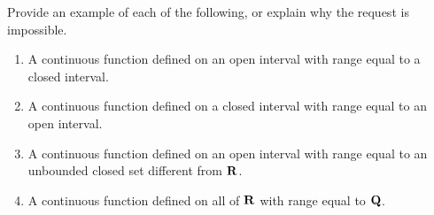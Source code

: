 \documentclass{lew98_solutions}
\begin{document}
\begin{exercise}
\label{ex:4.5.2}
    Provide an example of each of the following, or explain why the request is impossible.
    \begin{enumerate}
        \item A continuous function defined on an open interval with range equal to a closed interval.

        \item A continuous function defined on a closed interval with range equal to an open interval.

        \item A continuous function defined on an open interval with range equal to an unbounded closed set different from \( \mathbf{R} \).

        \item A continuous function defined on all of \( \mathbf{R} \) with range equal to \( \mathbf{Q} \).
    \end{enumerate}
\end{exercise}
\end{document}
